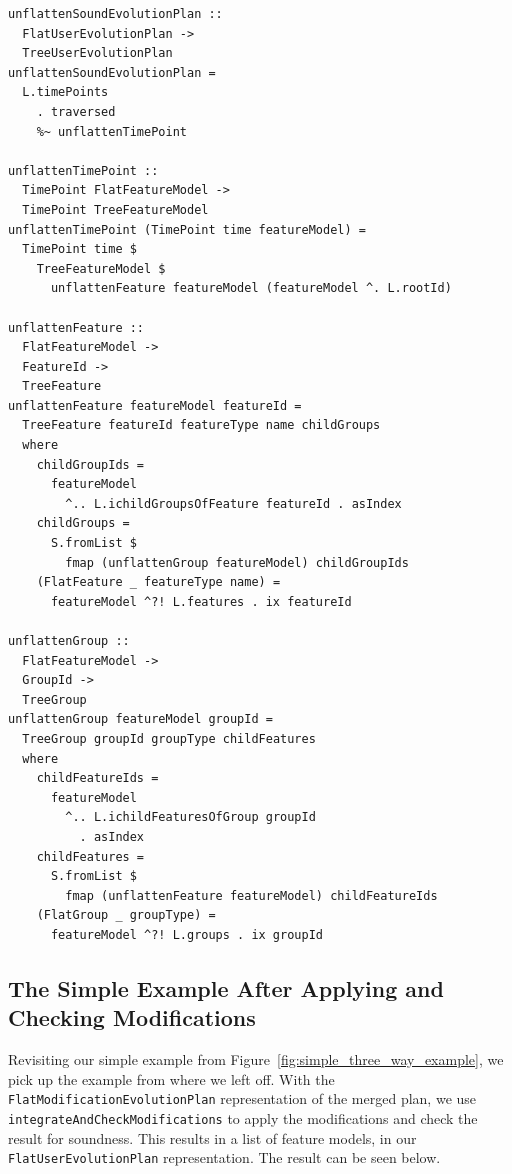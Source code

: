 \documentclass[a4paper,english]{ifimaster}
\begin{document}
\begin{verbatim}
unflattenSoundEvolutionPlan ::
  FlatUserEvolutionPlan ->
  TreeUserEvolutionPlan
unflattenSoundEvolutionPlan =
  L.timePoints
    . traversed
    %~ unflattenTimePoint

unflattenTimePoint ::
  TimePoint FlatFeatureModel ->
  TimePoint TreeFeatureModel
unflattenTimePoint (TimePoint time featureModel) =
  TimePoint time $
    TreeFeatureModel $
      unflattenFeature featureModel (featureModel ^. L.rootId)

unflattenFeature ::
  FlatFeatureModel ->
  FeatureId ->
  TreeFeature
unflattenFeature featureModel featureId =
  TreeFeature featureId featureType name childGroups
  where
    childGroupIds =
      featureModel
        ^.. L.ichildGroupsOfFeature featureId . asIndex
    childGroups =
      S.fromList $
        fmap (unflattenGroup featureModel) childGroupIds
    (FlatFeature _ featureType name) =
      featureModel ^?! L.features . ix featureId

unflattenGroup ::
  FlatFeatureModel ->
  GroupId ->
  TreeGroup
unflattenGroup featureModel groupId =
  TreeGroup groupId groupType childFeatures
  where
    childFeatureIds =
      featureModel
        ^.. L.ichildFeaturesOfGroup groupId
          . asIndex
    childFeatures =
      S.fromList $
        fmap (unflattenFeature featureModel) childFeatureIds
    (FlatGroup _ groupType) =
      featureModel ^?! L.groups . ix groupId
\end{verbatim}

\subsection{The Simple Example After Applying and Checking Modifications}%
\label{sub:the_simple_example_after_applying_and_checking_modifications}

Revisiting our simple example from Figure~\vref{fig:simple_three_way_example}, we pick up the example from where we left off. With the \texttt{Flat\-Modification\-Evolution\-Plan} representation of the merged plan, we use \texttt{integrate\-And\-Check\-Modifications} to apply the modifications and check the result for soundness. This results in a list of feature models, in our \texttt{Flat\-User\-Evolution\-Plan} representation. The result can be seen below.
\end{document}
